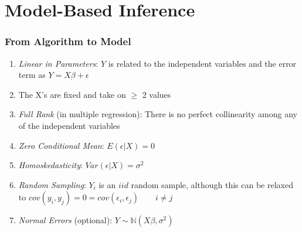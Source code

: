 \documentclass{beamer}
\newcommand{\field}[1]{\mathbb{#1}}
\begin{document}
\section{Model-Based Inference}
\begin{frame}[t]\frametitle{From Algorithm to Model}
	\begin{enumerate}
	\item<+-> \emph{Linear in Parameters}: $Y$ is related to the independent variables and the error term as $Y = X\beta + \epsilon$

	\item<+-> The X's are fixed and take on $\ge$ 2 values
	\item<+-> \emph{Full Rank} (in multiple regression): There is no perfect collinearity among any of the independent variables

	\item<+-> \emph{Zero Conditional Mean}: $E(\epsilon | X ) = 0$

	\item<+-> \emph{Homoskedasticity}: $Var(\epsilon | X) = \sigma^{2}$

	\item<+-> \emph{Random Sampling}: $Y_{i}$ is an $ iid$ random sample, although this can be relaxed to $cov(y_{i}, y_{j}) = 0 = cov(\epsilon_{i}, \epsilon_{j}) \qquad i \ne j$

	\item<+-> \emph{Normal Errors} (optional): $Y \sim \field{N}( X\beta, \sigma^2 ) $
	\end{enumerate}
\end{frame}
\end{document}
